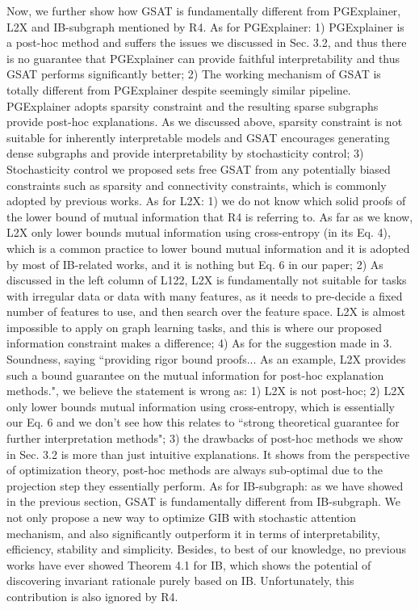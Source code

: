 \documentclass{article}
\begin{document}
Now, we further show how GSAT is fundamentally different from PGExplainer, L2X and IB-subgraph mentioned by R4. As for PGExplainer: 1) PGExplainer is a post-hoc method and suffers the issues we discussed in Sec. 3.2, and thus there is no guarantee that PGExplainer can provide faithful interpretability and thus GSAT performs significantly better; 2) The working mechanism of GSAT is totally different from PGExplainer despite seemingly similar pipeline. PGExplainer adopts sparsity constraint and the resulting sparse subgraphs provide post-hoc explanations. As we discussed above, sparsity constraint is not suitable for inherently interpretable models and GSAT encourages generating dense subgraphs and provide interpretability by stochasticity control; 3) Stochasticity control we proposed sets free GSAT from any potentially biased constraints such as sparsity and connectivity constraints, which is commonly adopted by previous works. As for L2X: 1) we do not know which solid proofs of the lower bound of mutual information that R4 is referring to. As far as we know, L2X only lower bounds mutual information using cross-entropy (in its Eq. 4), which is a common practice to lower bound mutual information and it is adopted by most of IB-related works, and it is nothing but Eq. 6 in our paper; 2) As discussed in the left column of L122, L2X is fundamentally not suitable for tasks with irregular data or data with many features, as it needs to pre-decide a fixed  number of features to use, and then search over the feature space. L2X is almost impossible to apply on graph learning tasks, and this is where our proposed information constraint makes a difference; 4) As for the suggestion made in 3. Soundness, saying ``providing rigor bound proofs... As an example, L2X provides such a bound guarantee on the mutual information for post-hoc explanation methods.", we believe the statement is wrong as: 1) L2X is not post-hoc; 2) L2X only lower bounds mutual information using cross-entropy, which is essentially our Eq. 6 and we don't see how this relates to ``strong theoretical guarantee for further interpretation methods"; 3) the drawbacks of post-hoc methods we show in Sec. 3.2 is more than just intuitive explanations. It shows from the perspective of optimization theory, post-hoc methods are always sub-optimal due to the projection step they essentially perform. As for IB-subgraph: as we have showed in the previous section, GSAT is fundamentally different from IB-subgraph. We not only propose a new way to optimize GIB with stochastic attention mechanism, and also significantly outperform it in terms of interpretability, efficiency, stability and simplicity. Besides, to best of our knowledge, no previous works have ever showed Theorem 4.1 for IB, which shows the potential of discovering invariant rationale purely based on IB. Unfortunately, this contribution is also ignored by R4.
\end{document}
